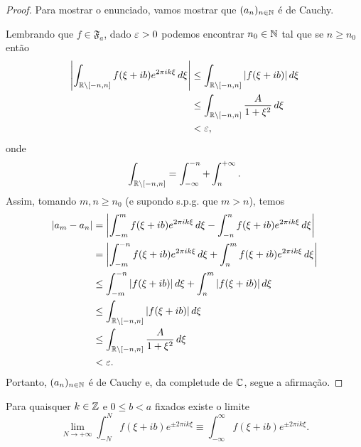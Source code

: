         \begin{proof}
            Para mostrar o enunciado, vamos mostrar que $(a_n)_{n\in\mathbb{N}}$ é de Cauchy.
            
            Lembrando que $f\in\mathfrak{F}_a$, dado $\varepsilon>0$ podemos encontrar $n_0\in\mathbb{N}$ 
            tal que se $n \geq n_0$ então
            \begin{align*}
                \left| \int_{\mathbb{R}\setminus[-n,n]} f(\xi + ib)e^{2\pi ik\xi} \, d\xi \right| 
                &\leq \int_{\mathbb{R}\setminus[-n,n]} |f(\xi + ib)| \, d\xi \\
                &\leq \int_{\mathbb{R}\setminus[-n,n]} \frac{A}{1+\xi^2} \, d\xi \\
                &< \varepsilon,
            \end{align*}
            onde
            \begin{equation*}
                \int_{\mathbb{R}\setminus[-n,n]} = \int_{-\infty}^{-n} + \int_n^{+\infty}.
            \end{equation*}
            Assim, tomando $m,n\geq n_0$ (e supondo s.p.g. que $m>n$), temos
            \begin{align*}
                |a_m - a_n| &= \left| \int_{-m}^m f(\xi + ib)e^{2\pi ik\xi} \, d\xi 
                            - \int_{-n}^n f(\xi + ib)e^{2\pi ik\xi} \, d\xi \right| \\
                            &= \left| \int_{-m}^{-n} f(\xi + ib)e^{2\pi ik\xi} \, d\xi 
                            + \int_{n}^m f(\xi + ib)e^{2\pi ik\xi} \, d\xi \right| \\
                            &\leq \int_{-m}^{-n} |f(\xi + ib)| \, d\xi 
                            + \int_{n}^m |f(\xi + ib)| \, d\xi \\
                            &\leq \int_{\mathbb{R}\setminus[-n,n]} |f(\xi + ib)| \, d\xi \\
                            &\leq \int_{\mathbb{R}\setminus[-n,n]} \frac{A}{1+\xi^2} \, d\xi \\
                            &< \varepsilon.
            \end{align*}
            Portanto, $(a_n)_{n\in\mathbb{N}}$ é de Cauchy e, da completude de $\mathbb{C}$, segue a afirmação.
        \end{proof}
        \begin{corolario}
            Para quaisquer $k\in\mathbb{Z}$ e $0\leq b < a$ fixados existe o limite
            \begin{equation*}
                \lim_{N\to +\infty} \int_{-N}^N f(\xi + ib) e^{\pm 2\pi ik\xi} 
                \equiv \int_{-\infty}^{\infty} f(\xi + ib) e^{\pm 2\pi ik\xi}.
            \end{equation*}
        \end{corolario}
